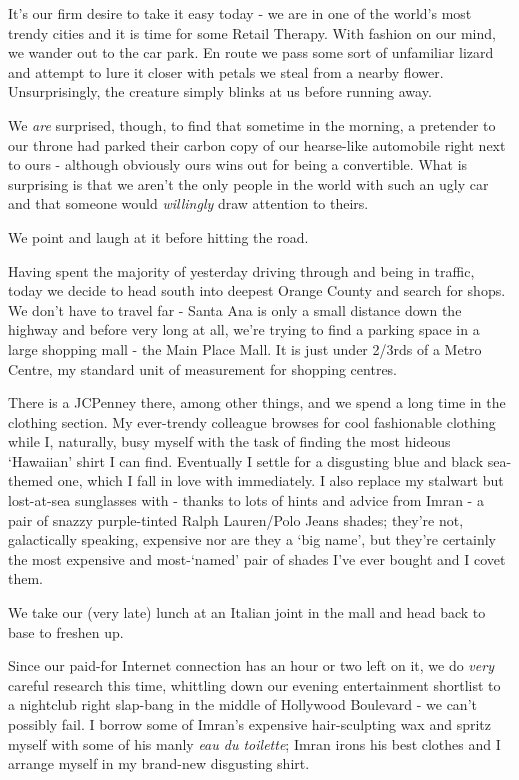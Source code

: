 \documentclass[a5paper,titlepage,11pt]{book}
\begin{document}
It's our firm desire to take it easy today - we are in one of the world's most trendy cities and it is time for some Retail Therapy.  With fashion on our mind, we wander out to the car park.  En route we pass some sort of unfamiliar lizard and attempt to lure it closer with petals we steal from a nearby flower.  Unsurprisingly, the creature simply blinks at us before running away.

We \emph{are} surprised, though, to find that sometime in the morning, a pretender to our throne had parked their carbon copy of our hearse-like automobile right next to ours - although obviously ours wins out for being a convertible.  What is surprising is that we aren't the only people in the world with such an ugly car and that someone would \emph{willingly} draw attention to theirs.

We point and laugh at it before hitting the road.

Having spent the majority of yesterday driving through and being in traffic, today we decide to head south into deepest Orange County and search for shops.  We don't have to travel far - Santa Ana is only a small distance down the highway and before very long at all, we're trying to find a parking space in a large shopping mall - the Main Place Mall.  It is just under 2/3rds of a Metro Centre, my standard unit of measurement for shopping centres.

There is a JCPenney there, among other things, and we spend a long time in the clothing section.  My ever-trendy colleague browses for cool fashionable clothing while I, naturally, busy myself with the task of finding the most hideous `Hawaiian' shirt I can find.  Eventually I settle for a disgusting blue and black sea-themed one, which I fall in love with immediately.  I also replace my stalwart but lost-at-sea sunglasses with - thanks to lots of hints and advice from Imran - a pair of snazzy purple-tinted Ralph Lauren/Polo Jeans shades; they're not, galactically speaking, expensive nor are they a `big name', but they're certainly the most expensive and most-`named' pair of shades I've ever bought and I covet them.

We take our (very late) lunch at an Italian joint in the mall and head back to base to freshen up.

 Since our paid-for Internet connection has an hour or two left on it, we do \emph{very} careful research this time, whittling down our evening entertainment shortlist to a nightclub right slap-bang in the middle of Hollywood Boulevard - we can't possibly fail.  I borrow some of Imran's expensive hair-sculpting wax and spritz myself with some of his manly \emph{eau du toilette}; Imran irons his best clothes and I arrange myself in my brand-new disgusting shirt.
\end{document}
